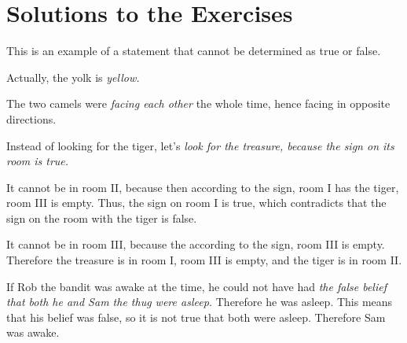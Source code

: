 \documentclass{article}
\begin{document}
\newpage 

\section*{Solutions to the Exercises}

\begin{soln} 
    This is an example of a statement that cannot be determined as true or false. 
\end{soln}

\begin{soln} 
    Actually, the yolk is \textit{yellow.}
\end{soln}

\begin{soln} 
    The two camels were \textit{facing each other} the whole time, hence facing in opposite directions.
\end{soln}

\begin{soln} 
    Instead of looking for the tiger, let's \textit{look for the treasure, because the sign on its room is true.}
    
    It cannot be in room II, because then according to the sign, room I has the tiger, room III is empty.
    Thus, the sign on room I is true, which contradicts that the sign on the room with the tiger is false.
    
    It cannot be in room III, because the according to the sign, room III is empty.
    Therefore the treasure is in room I, room III is empty, and the tiger is in room II.
\end{soln}

\begin{soln} 
    If Rob the bandit was awake at the time, he could not have had \textit{the false belief
    that both he and Sam the thug were asleep.}
    Therefore he was asleep. This means that his belief was false,
    so it is not true that both were asleep.
    Therefore Sam was awake.
\end{soln}
\end{document}

